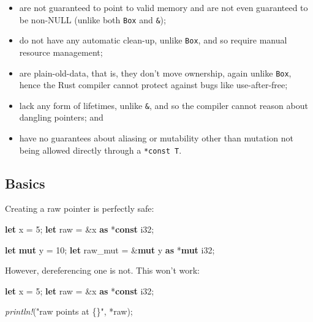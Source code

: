 \documentclass[a4paper,]{book}
\newenvironment{Shaded}{\begin{snugshade}}{\end{snugshade}}
\newcommand{\KeywordTok}[1]{\textcolor[rgb]{0.13,0.29,0.53}{\textbf{{#1}}}}
\newcommand{\DataTypeTok}[1]{\textcolor[rgb]{0.13,0.29,0.53}{{#1}}}
\newcommand{\DecValTok}[1]{\textcolor[rgb]{0.00,0.00,0.81}{{#1}}}
\newcommand{\StringTok}[1]{\textcolor[rgb]{0.31,0.60,0.02}{{#1}}}
\newcommand{\PreprocessorTok}[1]{\textcolor[rgb]{0.56,0.35,0.01}{\textit{{#1}}}}
\newcommand{\NormalTok}[1]{{#1}}
\providecommand{\tightlist}{%
  \setlength{\itemsep}{0pt}\setlength{\parskip}{0pt}}
\begin{document}
\begin{itemize}
\tightlist
\item
  are not guaranteed to point to valid memory and are not even
  guaranteed to be non-NULL (unlike both \texttt{Box} and \texttt{\&});
\item
  do not have any automatic clean-up, unlike \texttt{Box}, and so
  require manual resource management;
\item
  are plain-old-data, that is, they don't move ownership, again unlike
  \texttt{Box}, hence the Rust compiler cannot protect against bugs like
  use-after-free;
\item
  lack any form of lifetimes, unlike \texttt{\&}, and so the compiler
  cannot reason about dangling pointers; and
\item
  have no guarantees about aliasing or mutability other than mutation
  not being allowed directly through a \texttt{*const\ T}.
\end{itemize}

\subsection{Basics}\label{basics}

Creating a raw pointer is perfectly safe:

\begin{Shaded}
\begin{Highlighting}[]
\KeywordTok{let} \NormalTok{x = }\DecValTok{5}\NormalTok{;}
\KeywordTok{let} \NormalTok{raw = &x }\KeywordTok{as} \NormalTok{*}\KeywordTok{const} \DataTypeTok{i32}\NormalTok{;}

\KeywordTok{let} \KeywordTok{mut} \NormalTok{y = }\DecValTok{10}\NormalTok{;}
\KeywordTok{let} \NormalTok{raw_mut = &}\KeywordTok{mut} \NormalTok{y }\KeywordTok{as} \NormalTok{*}\KeywordTok{mut} \DataTypeTok{i32}\NormalTok{;}
\end{Highlighting}
\end{Shaded}

However, dereferencing one is not. This won't work:

\begin{Shaded}
\begin{Highlighting}[]
\KeywordTok{let} \NormalTok{x = }\DecValTok{5}\NormalTok{;}
\KeywordTok{let} \NormalTok{raw = &x }\KeywordTok{as} \NormalTok{*}\KeywordTok{const} \DataTypeTok{i32}\NormalTok{;}

\PreprocessorTok{println!}\NormalTok{(}\StringTok{"raw points at \{\}"}\NormalTok{, *raw);}
\end{Highlighting}
\end{Shaded}
\end{document}
